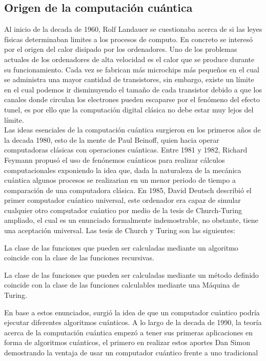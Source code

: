 \subsection{Origen de la computación cuántica}
Al inicio de la decada de 1960, Rolf Landauer se cuestionaba acerca de si las leyes físicas determinaban limites a los procesos de computo. En concreto
se interesó por el origen del calor disipado por los ordenadores. Uno de los problemas actuales de los ordenadores de alta velocidad
es el calor que se produce durante su funcionamiento. Cada vez se fabrican más microchips más pequeños en el cual se administra una mayor cantidad de transistores, sin embargo, 
existe un límite en el cual podemos ir disminuyendo el tamaño de cada transistor debido a que los canales donde circulan los electrones pueden escaparse por el fenómeno del 
efecto tunel, es por ello que la computación digital clásica no debe estar muy lejos del límite.\\
Las ideas esenciales de la computación cuántica surgieron en los primeros años de la decada 1980, esto de la mente de Paul Beinoff, quien hacia operar computadoras clásicas
con operaciones cuánticas. Entre 1981 y 1982, Richard Feymann propusó el uso de fenónemos cuánticos para realizar cálculos computacionales exponiendo la idea que, dada la naturaleza
de la mecánica cuántica algunos procesos se realizarian en un menor periodo de tiempo a comparación de una computadora clásica. En 1985, David Deutsch describió el primer computador cuántico
universal, este ordenador era capaz de simular cualquier otro computador cuántico por medio de la tesis de Church-Turing ampliado, el cual es un enunciado formalmente indemostrable, no obstante, tiene una aceptación
universal. Las tesis de Church y Turing son las siguientes:
\begin{tesis}[de Church]
    La clase de las funciones que pueden ser calculadas mediante un algoritmo coincide con la clase de las funciones recursivas.
\end{tesis}
\begin{tesis}[de Turing]
    La clase de las funciones que pueden ser calculadas mediante un método definido coincide con la clase de las funciones calculables mediante una Máquina de Turing.
\end{tesis}
En base a estos enunciados, surgió la idea de que un computador cuántico podría ejecutar diferentes algoritmos cuánticos. A lo largo de la decada de 1990, la teoría acerca de la computación
cuántica empezó a tener sus primeras aplicaciones en forma de algoritmos cuánticos, el primero en realizar estos aportes Dan Simon demostrando la ventaja de usar un computador cuántico frente a uno tradicional
